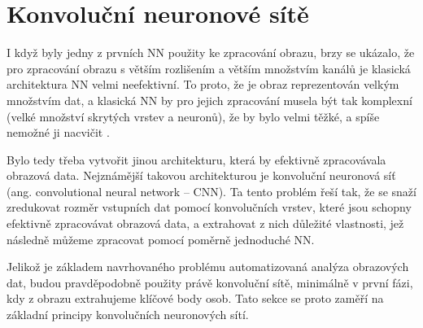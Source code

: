 \section{Konvoluční neuronové sítě}
\label{chap:CNN}

I když byly jedny z prvních NN použity ke zpracování obrazu, brzy se ukázalo,
že pro zpracování obrazu s větším rozlišením a větším množstvím kanálů je
klasická architektura NN velmi neefektivní. To proto, že je obraz reprezentován
velkým množstvím dat, a klasická NN by pro jejich zpracování musela být tak
komplexní (velké množství skrytých vrstev a neuronů), že by bylo velmi těžké, a
spíše nemožné ji nacvičit \cite{cnn_introduction}.

Bylo tedy třeba vytvořit jinou architekturu, která by efektivně zpracovávala
obrazová data. Nejznámější takovou architekturou je konvoluční neuronová síť
(ang. convolutional neural network – CNN). Ta tento problém řeší tak, že se
snaží zredukovat rozměr vstupních dat pomocí konvolučních vrstev, které jsou
schopny efektivně zpracovávat obrazová data, a extrahovat z nich důležité
vlastnosti, jež následně můžeme zpracovat pomocí poměrně jednoduché NN.

Jelikož je základem navrhovaného problému automatizovaná analýza obrazových
dat, budou pravděpodobně použity právě konvoluční sítě, minimálně v první fázi,
kdy z obrazu extrahujeme klíčové body osob. Tato sekce se proto zaměří na
základní principy konvolučních neuronových sítí.




